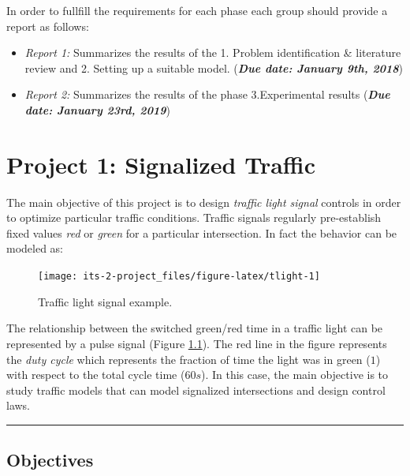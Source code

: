 \documentclass[]{book}
\theoremstyle{definition}
\theoremstyle{definition}
\theoremstyle{definition}
\theoremstyle{remark}
\begin{document}
In order to fullfill the requirements for each phase each group should
provide a report as follows:

\begin{itemize}
\item
  \emph{Report 1:} Summarizes the results of the 1. Problem
  identification \& literature review and 2. Setting up a suitable
  model. (\textbf{\emph{Due date: January 9th, 2018}})
\item
  \emph{Report 2:} Summarizes the results of the phase 3.Experimental
  results (\textbf{\emph{Due date: January 23rd, 2019}})
\end{itemize}

\hypertarget{project-1-signalized-traffic}{%
\chapter{Project 1: Signalized
Traffic}\label{project-1-signalized-traffic}}

The main objective of this project is to design \emph{traffic light
signal} controls in order to optimize particular traffic conditions.
Traffic signals regularly pre-establish fixed values \emph{red} or
\emph{green} for a particular intersection. In fact the behavior can be
modeled as:



\begin{figure}

{\centering \texttt{[image: its-2-project\_files/figure-latex/tlight-1]} 

}

\caption{Traffic light signal example.}\label{fig:tlight}
\end{figure}

The relationship between the switched green/red time in a traffic light
can be represented by a pulse signal (Figure \ref{fig:tlight}). The red
line in the figure represents the \emph{duty cycle} which represents the
fraction of time the light was in green (\(1\)) with respect to the
total cycle time (\(60s\)). In this case, the main objective is to study
traffic models that can model signalized intersections and design
control laws.

\begin{center}\rule{0.5\linewidth}{\linethickness}\end{center}

\hypertarget{objectives}{%
\section*{Objectives}\label{objectives}}
\end{document}

